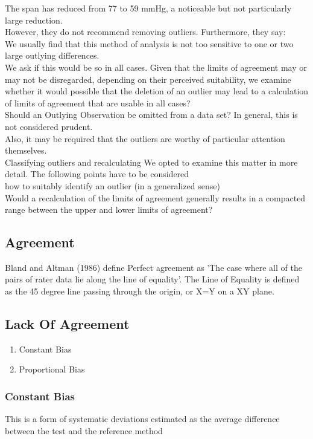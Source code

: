 \documentclass[12pt, a4paper]{report}
\begin{document}
The span has reduced from 77 to 59 mmHg, a noticeable but not
particularly large reduction.
\\
However, they do not recommend removing outliers. Furthermore,
they say:
\\
We usually find that this method of analysis is not too sensitive
to one or two large outlying differences.
\\
We ask if this would be so in all cases. Given that the limits of
agreement may or may not be disregarded, depending on their
perceived suitability, we examine whether it would possible that
the deletion of an outlier may lead to a calculation of limits of
agreement that are usable in all cases?
\\
Should an Outlying Observation be omitted from a data set? In
general, this is not considered prudent.
\\
Also, it may be required that the outliers are worthy of
particular attention themselves.
\\
Classifying outliers and recalculating We opted to examine this
matter in more detail. The following points have to be considered
\\how to suitably identify an outlier (in a generalized sense)
\\Would a recalculation of the limits of agreement generally
results in  a compacted range between the upper and lower limits
of agreement?
\subsection{Agreement} Bland and Altman (1986) define Perfect
agreement as 'The case where all of the pairs of rater data lie
along the line of equality'. The Line of Equality is defined as
the 45 degree line passing through the origin, or X=Y on a XY
plane.

\subsection{Lack Of Agreement}
\begin{enumerate}
\item Constant Bias\item Proportional Bias
\end{enumerate}

\subsubsection*{Constant Bias} This is a form of systematic
deviations estimated as the average difference between the test
and the reference method
\end{document}
